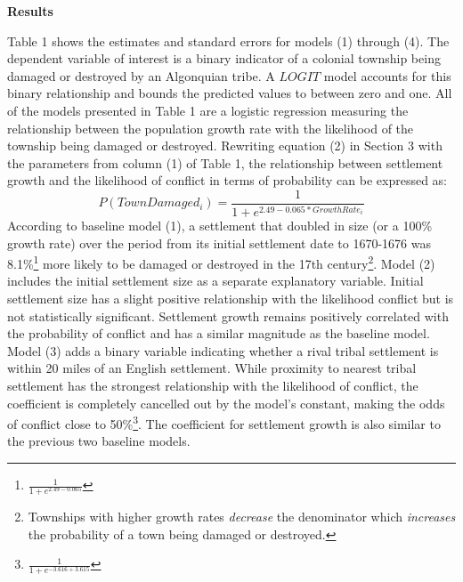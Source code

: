 \documentclass[11pt]{article}
\begin{document}
\noindent\textbf{Results}

Table 1 shows the estimates and standard errors for models (1) through (4). The dependent variable of interest is a binary indicator of a colonial township being damaged or destroyed by an Algonquian tribe. A $LOGIT$ model accounts for this binary relationship and bounds the predicted values to between zero and one. All of the models presented in Table 1 are a logistic regression measuring the relationship between the population growth rate with the likelihood of the township being damaged or destroyed. Rewriting equation (2) in Section 3 with the parameters from column (1) of Table 1, the relationship between settlement growth and the likelihood of conflict in terms of probability can be expressed as:
\[
P(TownDamaged_{i})=\frac{1}{1+e^{2.49-0.065*GrowthRate_{i}}}
\]
According to baseline model (1), a settlement that doubled in size (or a 100\% growth rate) over the period from its initial settlement date to 1670-1676 was 8.1\%\footnote{$\frac{1}{1+e^{2.49-0.065}}$} more likely to be damaged or destroyed in the 17th century\footnote{Townships with higher growth rates \textit{decrease} the denominator which \textit{increases} the probability of a town being damaged or destroyed.}. %
Model (2) includes the initial settlement size as a separate explanatory variable. Initial settlement size has a slight positive relationship with the likelihood conflict but is not statistically significant. Settlement growth remains positively correlated with the probability of conflict and has a similar magnitude as the baseline model. Model (3) adds a binary variable indicating whether a rival tribal settlement is within 20 miles of an English settlement. While proximity to nearest tribal settlement has the strongest relationship with the likelihood of conflict, the coefficient is completely cancelled out by the model's constant, making the odds of conflict close to 50\%\footnote{$\frac{1}{1+e^{-3.616+3.615}}$}. The coefficient for settlement growth is also similar to the previous two baseline models. 
\end{document}
